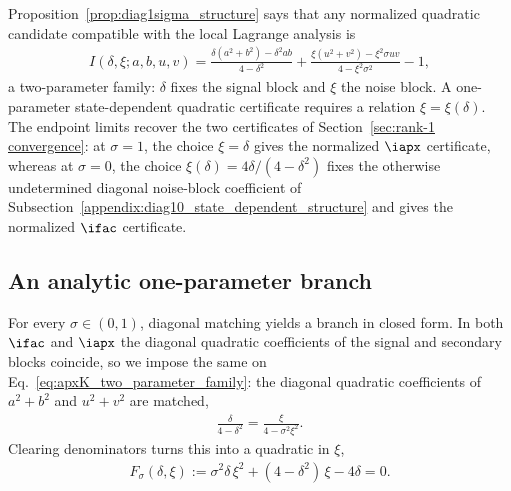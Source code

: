 \documentclass{article}
\begin{document}
Proposition~\ref{prop:diag1sigma_structure} says that any normalized quadratic
candidate compatible with the local Lagrange analysis is
\begin{align}
    I(\delta,\xi; a,b,u,v)
    =
    \frac{\delta(a^2+b^2)-\delta^2ab}{4-\delta^2}
    +
    \frac{\xi(u^2+v^2)-\xi^2\sigma uv}{4-\xi^2\sigma^2}
    -1,
    \label{eq:apxK_two_parameter_family}
\end{align}
a two-parameter family: $\delta$ fixes the signal block and $\xi$ the noise
block. A one-parameter state-dependent quadratic certificate requires a
relation $\xi=\xi(\delta)$. The endpoint limits recover the two certificates
of Section~\ref{sec:rank-1 convergence}: at $\sigma=1$, the choice $\xi=\delta$
gives the normalized $\iapx$ certificate, whereas at $\sigma=0$, the choice
$\xi(\delta)=4\delta/(4-\delta^2)$ fixes the otherwise undetermined diagonal
noise-block coefficient of
Subsection~\ref{appendix:diag10_state_dependent_structure} and gives the
normalized $\ifac$ certificate.

\subsection{An analytic one-parameter branch}
\label{subsec:xi_selector}

For every $\sigma\in(0,1)$, diagonal matching yields a branch in closed
form. In both $\ifac$ and $\iapx$ the diagonal quadratic coefficients of the
signal and secondary blocks coincide, so we impose the same on
Eq.~\eqref{eq:apxK_two_parameter_family}: the diagonal quadratic coefficients
of $a^2+b^2$ and $u^2+v^2$ are matched,
\begin{align}
    \frac{\delta}{4-\delta^2}
    =
    \frac{\xi}{4-\sigma^2\xi^2}.
    \label{eq:apxK_coefficient_matching}
\end{align}
Clearing denominators turns this into a quadratic in $\xi$,
\begin{align}
    F_\sigma(\delta,\xi)
    :=
    \sigma^2\delta\,\xi^2+(4-\delta^2)\,\xi-4\delta
    =
    0 .
    \label{eq:apxK_selector_quadratic}
\end{align}
\end{document}
